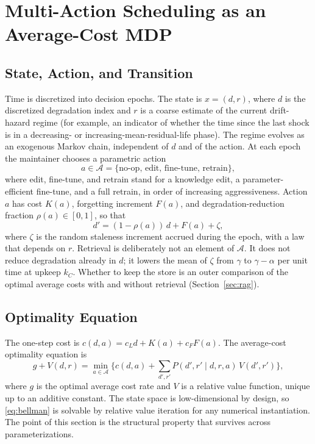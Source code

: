 \documentclass[journal]{IEEEtran}
\begin{document}
\section{Multi-Action Scheduling as an Average-Cost MDP}\label{sec:mdp}
\subsection{State, Action, and Transition}
Time is discretized into decision epochs. The state is $x=(d,r)$, where $d$ is the discretized degradation index and $r$ is a coarse estimate of the current drift-hazard regime (for example, an indicator of whether the time since the last shock is in a decreasing- or increasing-mean-residual-life phase). The regime evolves as an exogenous Markov chain, independent of $d$ and of the action. At each epoch the maintainer chooses a parametric action
\begin{equation}
a\in\mathcal A=\{\text{no-op, edit, fine-tune, retrain}\},
\end{equation}
where edit, fine-tune, and retrain stand for a knowledge edit, a parameter-efficient fine-tune, and a full retrain, in order of increasing aggressiveness. Action $a$ has cost $K(a)$, forgetting increment $F(a)$, and degradation-reduction fraction $\rho(a)\in[0,1]$, so that
\begin{equation}
d'=(1-\rho(a))\,d+F(a)+\zeta,
\label{eq:trans}
\end{equation}
where $\zeta$ is the random staleness increment accrued during the epoch, with a law that depends on $r$. Retrieval is deliberately not an element of $\mathcal A$. It does not reduce degradation already in $d$; it lowers the mean of $\zeta$ from $\gamma$ to $\gamma-\alpha$ per unit time at upkeep $k_C$. Whether to keep the store is an outer comparison of the optimal average costs with and without retrieval (Section~\ref{sec:rag}).

\subsection{Optimality Equation}
The one-step cost is $c(d,a)=c_L d+K(a)+c_F F(a)$. The average-cost optimality equation \cite{puterman1994,bertsekas2017} is
\begin{equation}
g+V(d,r)=\min_{a\in\mathcal A}\Big\{c(d,a)+\sum_{d',r'}P(d',r'\mid d,r,a)\,V(d',r')\Big\},
\label{eq:bellman}
\end{equation}
where $g$ is the optimal average cost rate and $V$ is a relative value function, unique up to an additive constant. The state space is low-dimensional by design, so \eqref{eq:bellman} is solvable by relative value iteration for any numerical instantiation. The point of this section is the structural property that survives across parameterizations.
\end{document}
